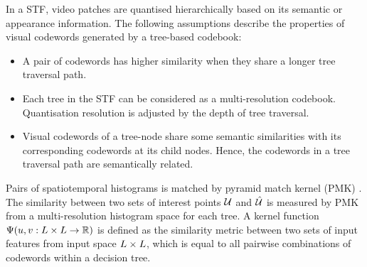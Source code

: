 In a STF, video patches are quantised hierarchically based on its semantic or appearance information. The following assumptions describe the properties of visual codewords generated by a tree-based codebook:
\begin{itemize}
	\item A pair of codewords has higher similarity when they share a longer tree traversal path. 
	\item Each tree in the STF can be considered as a multi-resolution codebook. Quantisation resolution is adjusted by the depth of tree traversal.
	\item Visual codewords of a tree-node share some semantic similarities with its corresponding codewords at its child nodes. Hence, the codewords in a tree traversal path are semantically related. 
\end{itemize} 

Pairs of spatiotemporal histograms is matched by pyramid match kernel (PMK) \cite{Grauman2005}. 
The similarity between two sets of interest points $\mathcal{U}$ and $\mathcal{\hat{U}}$ is measured by PMK from a multi-resolution histogram space for each tree. 
A kernel function $\Psi(u,v: L \times L \rightarrow \mathbb{R})$ is defined as the similarity metric between two sets of input features from input space $L \times L$, which is equal to all pairwise combinations of codewords within a decision tree.  

